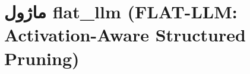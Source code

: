 \section{ماژول flat\_llm (FLAT-LLM: Activation-Aware Structured Pruning)}
\label{sec:module_flat_llm}
